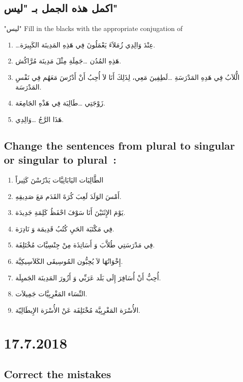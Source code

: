 \documentclass[a4paper]{article}
\begin{document}
\subsection{اكمل هذه الجمل بـ "ليس"}
"ليس"   Fill in the blacks with the appropriate conjugation of
\begin{enumerate}
\item \dots عِنْدَ وَالِدِي زُمَلاَءَ يَعْمَلُونَ فِي هَذِهِ المَدِينَة الكَبِيرَة.
\item هَذِهِ المُدُن \dots  جَمِلَةِ مِثْلَ مَدِينَة مُرَّاكُش.
\item الُّلاَبُ فِي هَدِهِ المَدْرَسَةِ \dots   لَطِفِينَ مَعِي، لِذَلِكَ أَنَا لاَ أُحِبُ أَنْ أَدْرُسَ مَعَهُم فِي نَفْسِ المَدْرَسَة.
\item زَوْجَتِي \dots طَالِبَة فِي هَذْهِ الجَامِعَة.
\item هَذَا الرَّجُ  \dots  وَالِدِي.  
\end{enumerate}


\subsection{Change the sentences from plural to singular or singular to plural :}

\begin{enumerate}
\item الطَّالِبَات اليَابَانِيَّات يَدْرُسْنَ كَثِيراً
\item أَمْسَ الوَلَدَ لَعِبَ كُرَةَ القَدَم مَعَ صَدِيقِهِ.
\item يَوْمَ الإِثَنَيْنَ  أَنَا سَوْفَ احْفَظُ كَلِمَةِ جَدِيدَة.
\item فِي مَكْتَبَة الحَيِ كُتُبُ قَدِيمَة وَ نَادِرَة.
\item فِي مَدْرَسَتِي طُلاَّبَ وَ أَسَاتِذَة مِنْ جِنْسِيَّات مُخْتَلِفَة.
\item إِخْوَاتُهَا لاَ يُحِبُّون المُوسِيقَى الكَلاَسِيكِيَّة.
\item أُحِبُّ أَنْ أُسَافِرَ إِلَى بَلَد عَرَبِّي وَ أَزُورَ المَدِينَة الجَميِلَة.
\item النِّسَاء المَغْرِبِيَّات جَمِيلاَت.
\item الأُسْرَة المَغْرِبِيَّة مُخْتَلِفَة عَنْ الأُسْرَة الإِيطَالِيّة.
\end{enumerate}

\section{17.7.2018}
\subsection{Correct the mistakes}
\end{document}
